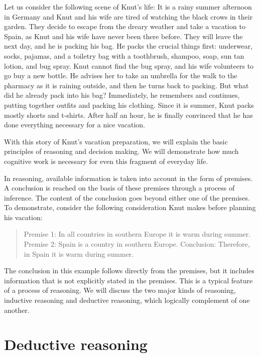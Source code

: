 \documentclass[
]{krantz}
\begin{document}
Let us consider the following scene of Knut's life: It is a rainy summer afternoon in Germany and Knut and his wife are tired of watching the black crows in their garden. They decide to escape from the dreary weather and take a vacation to Spain, as Knut and his wife have never been there before. They will leave the next day, and he is packing his bag. He packs the crucial things first: underwear, socks, pajamas, and a toiletry bag with a toothbrush, shampoo, soap, sun tan lotion, and bug spray. Knut cannot find the bug spray, and his wife volunteers to go buy a new bottle. He advises her to take an umbrella for the walk to the pharmacy as it is raining outside, and then he turns back to packing. But what did he already pack into his bag? Immediately, he remembers and continues, putting together outfits and packing his clothing. Since it is summer, Knut packs mostly shorts and t-shirts. After half an hour, he is finally convinced that he has done everything necessary for a nice vacation.

With this story of Knut's vacation preparation, we will explain the basic principles of reasoning and decision making. We will demonstrate how much cognitive work is necessary for even this fragment of everyday life.

In reasoning, available information is taken into account in the form of premises. A conclusion is reached on the basis of these premises through a process of inference. The content of the conclusion goes beyond either one of the premises. To demonstrate, consider the following consideration Knut makes before planning his vacation:

\begin{quote}
Premise 1: In all countries in southern Europe it is warm during summer.
Premise 2: Spain is a country in southern Europe.
Conclusion: Therefore, in Spain it is warm during summer.
\end{quote}

The conclusion in this example follows directly from the premises, but it includes information that is not explicitly stated in the premises. This is a typical feature of a process of reasoning. We will discuss the two major kinds of reasoning, inductive reasoning and deductive reasoning, which logically complement of one another.

\hypertarget{deductive-reasoning}{%
\section{Deductive reasoning}\label{deductive-reasoning}}
\end{document}
